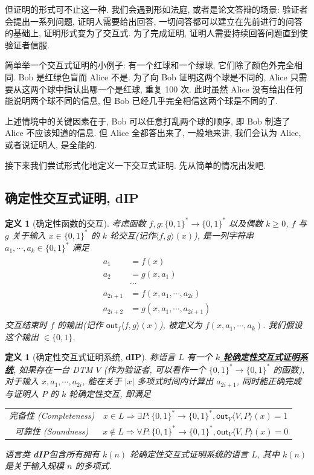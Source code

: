\documentclass[8pt]{article}
\theoremstyle{compact}
\newtheorem{definition}[theorem]{定义}
\def\obj#1{\textbf{\uline{#1}}}
\def\ge{\geqslant}
\begin{document}
但证明的形式可不止这一种. 我们会遇到形如法庭, 或者是论文答辩的场景: 验证者会提出一系列问题, 证明人需要给出回答, 一切问答都可以建立在先前进行的问答的基础上, 证明形式变为了交互式. 为了完成证明, 证明人需要持续回答问题直到使验证者信服.

简单举一个交互式证明的小例子: 有一个红球和一个绿球, 它们除了颜色外完全相同. Bob 是红绿色盲而 Alice 不是. 为了向 Bob 证明这两个球是不同的, Alice 只需要从这两个球中指认出哪一个是红球, 重复 100 次. 此时虽然 Alice 没有给出任何能说明两个球不同的信息, 但 Bob 已经几乎完全相信这两个球是不同的了.

上述情境中的关键因素在于, Bob 可以任意打乱两个球的顺序, 即 Bob 制造了 Alice 不应该知道的信息. 但 Alice 全都答出来了, 一般地来讲, 我们会认为 Alice, 或者说证明人, 是全能的.

接下来我们尝试形式化地定义一下交互式证明. 先从简单的情况出发吧.

\def\dIP{\textbf{dIP}}
\subsection{确定性交互式证明, \dIP}
\begin{definition}[确定性函数的交互]
	考虑函数 $f, g: \{0, 1\}^* \to \{0, 1\}^*$ 以及偶数 $k \ge 0$, $f$ 与 $g$ 关于输入 $x \in \{0, 1\}^*$ 的 $k$ 轮交互(记作$\langle f, g\rangle(x)$), 是一列字符串 $a_1, \cdots, a_k \in \{0, 1\}^*$ 满足 \begin{align*}
		\begin{split}
			a_1 &= f(x) \\
			a_2 &= g(x, a_1) \\ 
			&\cdots \\
			a_{2i+1} &= f(x, a_1, \cdots, a_{2i}) \\
			a_{2i+2} &= g(x, a_1, \cdots, a_{2i+1})			
		\end{split}
	\end{align*}
	交互结束时 $f$ 的输出(记作 $\textsf{out}_f\langle f, g \rangle (x)$), 被定义为 $f(x, a_1, \cdots, a_k)$. 我们假设这个输出 $\in \{0, 1\}$.
	\label{deterministic_interaction}
\end{definition}
\begin{definition}[确定性交互式证明系统, \dIP]
	称语言 $L$ 有一个 \obj{$k$ 轮确定性交互式证明系统}, 如果存在一台 DTM $V$ (作为验证者, 可以看作一个 $\{0, 1\}^* \to \{0, 1\}^*$ 的函数), 对于输入 $x, a_1, \cdots, a_{2i}$, 能在关于 $|x|$ 多项式时间内计算出 $a_{2i+1}$, 同时能正确完成与证明人 $P$ 的 $k$ 轮确定性交互, 即满足 \begin{center}
		\begin{tabular}{cc}
			完备性 (Completeness) & $x \in L \Rightarrow \exists P: \{0, 1\}^* \to \{0, 1\}^*, \textsf{out}_V\langle V, P\rangle(x) = 1$ \\
			可靠性 (Soundness) & $x \notin L \Rightarrow \forall P: \{0, 1\}^* \to \{0, 1\}^*, \textsf{out}_V\langle V, P\rangle(x) = 0$ \\
		\end{tabular}
	\end{center}
	语言类 \dIP 包含所有拥有 $k(n)$ 轮确定性交互式证明系统的语言 $L$, 其中 $k(n)$ 是关于输入规模 $n$ 的多项式.
\end{definition}
\end{document}
